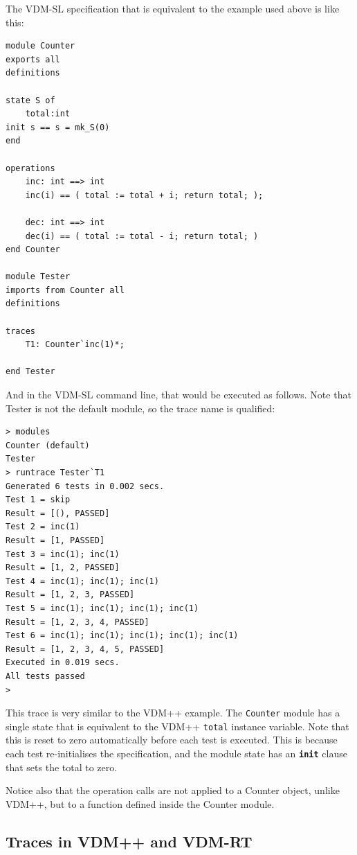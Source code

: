 \documentclass{overturerepchap}
\begin{document}
The VDM-SL specification that is equivalent to the example used above is like
this:

\small
\begin{lstlisting}
module Counter
exports all
definitions

state S of
    total:int
init s == s = mk_S(0)
end

operations
    inc: int ==> int
    inc(i) == ( total := total + i; return total; );

    dec: int ==> int
    dec(i) == ( total := total - i; return total; )
end Counter

module Tester
imports from Counter all
definitions

traces
    T1: Counter`inc(1)*;

end Tester
\end{lstlisting}
\normalsize

\noindent And in the VDM-SL command line, that would be executed as follows. Note that
Tester is not the default module, so the trace name is qualified:

\scriptsize
\lstset{style=tool,language=}
\begin{lstlisting}[escapechar=@]
> modules
Counter (default)
Tester
> runtrace Tester`T1
Generated 6 tests in 0.002 secs. 
Test 1 = skip
Result = [(), PASSED]
Test 2 = inc(1)
Result = [1, PASSED]
Test 3 = inc(1); inc(1)
Result = [1, 2, PASSED]
Test 4 = inc(1); inc(1); inc(1)
Result = [1, 2, 3, PASSED]
Test 5 = inc(1); inc(1); inc(1); inc(1)
Result = [1, 2, 3, 4, PASSED]
Test 6 = inc(1); inc(1); inc(1); inc(1); inc(1)
Result = [1, 2, 3, 4, 5, PASSED]
Executed in 0.019 secs. 
All tests passed
>
\end{lstlisting}
\lstset{style=mystyle}
\lstset{language=VDM++}
\normalsize

\noindent This trace is very similar to the VDM++ example. The \texttt{Counter} module has a
single state that is equivalent to the VDM++ \texttt{total} instance variable.
Note that this is reset to zero automatically before each test is executed. This is
because each test re-initialises the specification, and the module
state has an \texttt{\textbf{init}} clause that sets the total to zero.

Notice also that the operation calls are not applied to a Counter object, unlike
VDM++, but to a function defined inside the Counter module.

\subsection{Traces in VDM++ and VDM-RT}
\end{document}
